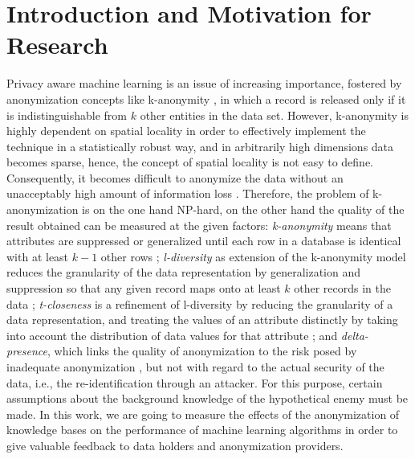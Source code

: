 \documentclass{llncs}
\begin{document}
\renewcommand{\thesubfigure}{\thefigure.\arabic{subfigure}}
\makeatletter
\renewcommand{\p@subfigure}{}
\renewcommand{\@thesubfigure}{\thesubfigure:\hskip\subfiglabelskip}
\makeatother


\section{Introduction and Motivation for Research}

Privacy aware machine learning \cite{DuchiJordan:2014:PrivacyAwareLearning} is an issue of increasing importance, fostered by anonymization concepts like k-anonymity \cite{Samarati:2001:kAnonymity}, in which a record is released only if it is indistinguishable from $k$ other entities in the data set. However, k-anonymity is highly dependent on spatial locality in order to effectively implement the technique in a statistically robust way, and in arbitrarily high dimensions data becomes sparse, hence, the concept of spatial locality is not easy to define. Consequently, it becomes difficult to anonymize the data without an unacceptably high amount of information loss \cite{Aggarwal:2005:kAnonymity}. Therefore, the problem of k-anonymization is on the one hand NP-hard, on the other hand the quality of the result obtained can be measured at the given factors: \emph{k-anonymity} means that attributes are suppressed or generalized until each row in a database is identical with at least $k-1$ other rows \cite{Sweeney:2002:k-Anonymity}; \emph{l-diversity} as extension of the k-anonymity model reduces the granularity of the data representation by generalization and suppression so that any given record maps onto at least $k$ other records in the data \cite{MachanavajjhalaEtAl:2007:l-Diversity}; \emph{t-closeness} is a refinement of l-diversity by reducing the granularity of a data representation, and treating the values of an attribute distinctly by taking into account the distribution of data values for that attribute \cite{LiEtAl:2007:t-closeness}; and \emph{delta-presence}, which links the quality of anonymization to the risk posed by inadequate anonymization \cite{NergizClifton:2010:Delta-Presence}, but not with regard to the actual security of the data, i.e., the re-identification through an attacker. For this purpose, certain assumptions about the background knowledge of the hypothetical enemy must be made. In this work, we are going to measure the effects of the anonymization of knowledge bases on the performance of machine learning algorithms in order to give valuable feedback to data holders and anonymization providers.
\end{document}
